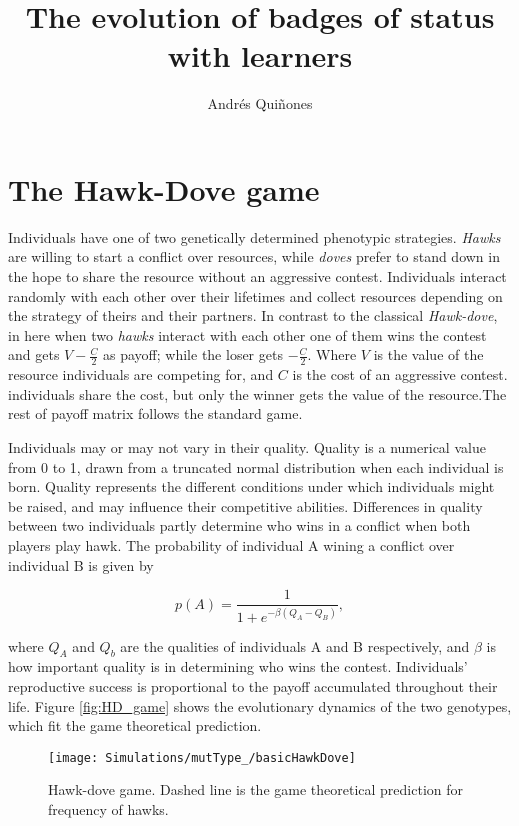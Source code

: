 \documentclass[]{article}
\title{The evolution of badges of status with learners}
\author{Andrés Quiñones}
\date{}
\begin{document}
\maketitle

\hypertarget{the-hawk-dove-game}{%
\section{The Hawk-Dove game}\label{the-hawk-dove-game}}

Individuals have one of two genetically determined phenotypic
strategies. \emph{Hawks} are willing to start a conflict over resources,
while \emph{doves} prefer to stand down in the hope to share the
resource without an aggressive contest. Individuals interact randomly
with each other over their lifetimes and collect resources depending on
the strategy of theirs and their partners. In contrast to the classical
\emph{Hawk-dove}, in here when two \emph{hawks} interact with each other
one of them wins the contest and gets \(V-\frac{C}{2}\) as payoff; while
the loser gets \(-\frac{C}{2}\). Where \(V\) is the value of the
resource individuals are competing for, and \(C\) is the cost of an
aggressive contest. individuals share the cost, but only the winner gets
the value of the resource.The rest of payoff matrix follows the standard
game.

Individuals may or may not vary in their quality. Quality is a numerical
value from 0 to 1, drawn from a truncated normal distribution when each
individual is born. Quality represents the different conditions under
which individuals might be raised, and may influence their competitive
abilities. Differences in quality between two individuals partly
determine who wins in a conflict when both players play hawk. The
probability of individual A wining a conflict over individual B is given
by

\begin{equation}
p(A)=\frac{1}{1+e^{-\beta(Q_A-Q_B)}},
\end{equation}

where \(Q_A\) and \(Q_b\) are the qualities of individuals A and B
respectively, and \(\beta\) is how important quality is in determining
who wins the contest. Individuals' reproductive success is proportional
to the payoff accumulated throughout their life. Figure
\ref{fig:HD_game} shows the evolutionary dynamics of the two genotypes,
which fit the game theoretical prediction.

\begin{figure}
\texttt{[image: Simulations/mutType\_/basicHawkDove]} \caption{\label{fig:HD_game}Hawk-dove game. Dashed line is the  game theoretical prediction for frequency of hawks.}\label{fig:fig1}
\end{figure}
\end{document}
